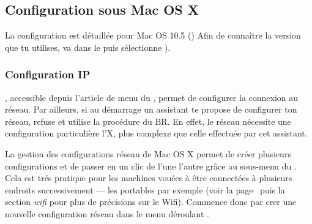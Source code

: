 

\subsection{Configuration sous Mac OS X}

La configuration est détaillée pour Mac OS 10.5 () %
Afin de connaître la version que tu utilises, va dans le  puis sélectionne ).

\subsubsection{Configuration IP}

 , accessible depuis l'article de menu  du , permet de configurer la connexion au réseau. Par ailleurs, si au démarrage un assistant te propose de configurer ton réseau, refuse et utilise la procédure du BR. En effet, le réseau nécessite une configuration particulière  l'X, plus complexe que celle effectuée par cet assistant.



La gestion des configurations réseau de Mac OS X permet de créer plusieurs configurations et de passer en un clic de l'une  l'autre grâce au sous-menu  du . Cela est trés pratique pour les machines vouées à être connectées à plusieurs endroits successivement --- les portables par exemple (voir la page~\pageref{wifi} puis la section \emph{wifi} pour plus de précisions sur le Wifi). Commence donc par crer une nouvelle configuration réseau dans le menu déroulant .

